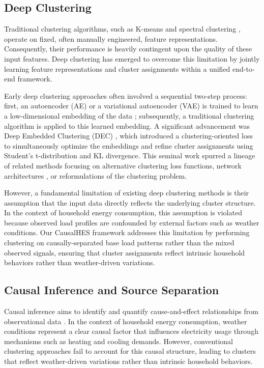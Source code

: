 \documentclass[journal]{IEEEtran}
\begin{document}
\subsection{Deep Clustering}
Traditional clustering algorithms, such as K-means \cite{kmeans_clustering} and spectral clustering \cite{spectral_clustering}, operate on fixed, often manually engineered, feature representations. Consequently, their performance is heavily contingent upon the quality of these input features. Deep clustering has emerged to overcome this limitation by jointly learning feature representations and cluster assignments within a unified end-to-end framework.

Early deep clustering approaches often involved a sequential two-step process: first, an autoencoder (AE) or a variational autoencoder (VAE) is trained to learn a low-dimensional embedding of the data \cite{autoencoder_representation_learning}; subsequently, a traditional clustering algorithm is applied to this learned embedding. A significant advancement was Deep Embedded Clustering (DEC) \cite{deep_embedding_clustering_xie}, which introduced a clustering-oriented loss to simultaneously optimize the embeddings and refine cluster assignments using Student's t-distribution and KL divergence. This seminal work spurred a lineage of related methods focusing on alternative clustering loss functions, network architectures \cite{improved_dec}, or reformulations of the clustering problem.

However, a fundamental limitation of existing deep clustering methods is their assumption that the input data directly reflects the underlying cluster structure. In the context of household energy consumption, this assumption is violated because observed load profiles are confounded by external factors such as weather conditions. Our CausalHES framework addresses this limitation by performing clustering on causally-separated base load patterns rather than the mixed observed signals, ensuring that cluster assignments reflect intrinsic household behaviors rather than weather-driven variations.

\subsection{Causal Inference and Source Separation}
Causal inference aims to identify and quantify cause-and-effect relationships from observational data \cite{pearl2009causality}. In the context of household energy consumption, weather conditions represent a clear causal factor that influences electricity usage through mechanisms such as heating and cooling demands. However, conventional clustering approaches fail to account for this causal structure, leading to clusters that reflect weather-driven variations rather than intrinsic household behaviors.
\end{document}
